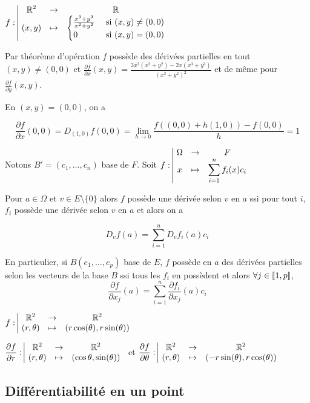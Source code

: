 \begin{exemple}
    $f: \space \begin{array}{|ccc} \displaystyle \mathbb{R}^2 & \to & \displaystyle \mathbb{R} \\ \displaystyle (x, y) & \mapsto & \displaystyle \begin{cases}
        \frac{x^3 + y^3}{x^2 + y^2} & \text{ si } (x, y) \neq (0, 0) \\
        0 & \text{ si } (x, y) = (0, 0)
    \end{cases} \end{array}$

    Par théorème d'opération $f$ possède des dérivées partielles en tout $(x, y) \neq (0, 0)$
    et $\displaystyle \frac{\partial f}{\partial x} (x, y) = \frac{3x^2(x^2 + y^2) - 2x(x^3 + y^3)}{(x^2 + y^2)^2}$
    et de même pour $\frac{\partial f}{\partial y} (x, y)$. 

    En $(x, y) = (0, 0)$, on a 
    
    $$\displaystyle \frac{\partial f}{\partial x}(0, 0) = D_{(1, 0)}f(0, 0) = \lim_{h \to 0} \frac{f((0, 0) + h(1, 0)) - f(0, 0)} h = 1$$
\end{exemple}

\begin{remarque}
    Notons $B' = (c_1, \dots, c_n)$ base de $F$. Soit $f: \space \begin{array}{|ccc} \displaystyle \Omega & \to & \displaystyle F \\ \displaystyle x & \mapsto & \displaystyle \sum_{i = 1 }^{n } f_i(x)c_i \end{array}$

    Pour $a \in \Omega$ et $v \in E \setminus \{0\}$ alors $f$ possède une dérivée selon $v$ en $a$
    ssi pour tout $i$, $f_i$ possède une dérivée selon $v$ en $a$ et alors on a 

    $$D_vf(a) = \sum_{i = 1 }^{n } D_vf_i(a) c_i$$

    En particulier, si $B(e_1, \dots, e_p)$ base de $E$, $f$ possède en $a$ des dérivées partielles 
    selon les vecteurs de la base $B$ ssi tous les $f_i$ en possèdent et alors 
    $\forall j \in [\![1, p]\!]$, 
    $$\frac{\partial f}{\partial x_j} (a) = \sum_{i = 1 }^{n } \frac{\partial f_i}{\partial x_j} (a) c_i$$
\end{remarque}

\begin{exemple}
    $f: \space \begin{array}{|ccc} \displaystyle \mathbb{R}^2 & \to & \displaystyle \mathbb{R}^2 \\ \displaystyle (r, \theta) & \mapsto & \displaystyle (r \cos(\theta), r \sin (\theta)) \end{array}$

    \avspace $\displaystyle \frac{\partial f}{\partial r}: \space \begin{array}{|ccc} \displaystyle \mathbb{R}^2 & \to & \displaystyle \mathbb{R}^2 \\ \displaystyle (r, \theta) & \mapsto & \displaystyle (\cos \theta, \sin(\theta)) \end{array}$
    \quad et \quad  $\displaystyle \frac{\partial f}{\partial \theta}: \space \begin{array}{|ccc} \displaystyle \mathbb{R}^2 & \to & \displaystyle \mathbb{R}^2 \\ \displaystyle (r, \theta) & \mapsto & \displaystyle (-r \sin(\theta), r \cos(\theta)) \end{array}$
\end{exemple}

\subsection{Différentiabilité en un point}

